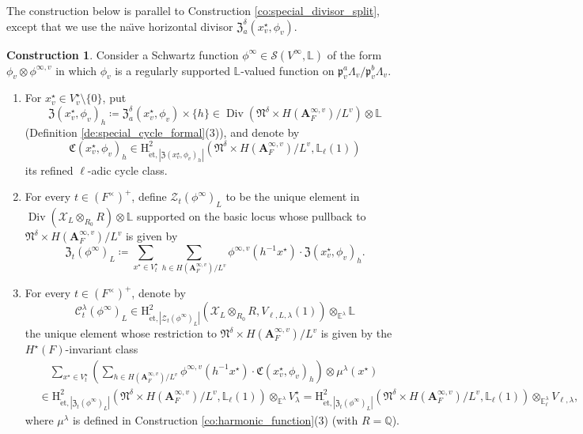 \documentclass[12pt]{amsart}
\numberwithin{equation}{section}
\theoremstyle{plain}
\theoremstyle{definition}
\newtheorem{construction}[proposition]{Construction}
\theoremstyle{remark}
\renewcommand{\b}[1]{\mathbf{#1}}
\renewcommand{\c}[1]{\mathcal{#1}}
\renewcommand{\d}[1]{\mathbb{#1}}
\newcommand{\f}[1]{\mathfrak{#1}}
\renewcommand{\r}[1]{\mathrm{#1}}
\newcommand{\s}[1]{\mathscr{#1}}
\renewcommand{\(}{\left(}
\renewcommand{\)}{\right)}
\newcommand{\bA}{\b A}
\newcommand{\cC}{\c C}
\newcommand{\cX}{\c X}
\newcommand{\cZ}{\c Z}
\newcommand{\dE}{\d E}
\newcommand{\dL}{\d L}
\newcommand{\dQ}{\d Q}
\newcommand{\fC}{\f C}
\newcommand{\fN}{\f N}
\newcommand{\fZ}{\f Z}
\newcommand{\fp}{\f p}
\newcommand{\rH}{\r H}
\newcommand{\sS}{\s S}
\newcommand{\et}{{\acute{\r{e}}\r{t}}}
\DeclareMathOperator{\Div}{Div}
\begin{document}
The construction below is parallel to Construction \ref{co:special_divisor_split}, except that we use the na\"{\i}ve horizontal divisor $\fZ_a^\delta(x^\star_v,\phi_v)$.

\begin{construction}\label{co:special_divisor_nonsplit}
Consider a Schwartz function $\phi^\infty\in\sS(V^\infty,\dL)$ of the form $\phi_v\otimes\phi^{\infty,v}$ in which $\phi_v$ is a regularly supported $\dL$-valued function on $\fp_v^a\Lambda_v/\fp_v^b\Lambda_v$.
\begin{enumerate}
  \item For $x^\star_v\in V^\star_v\setminus\{0\}$, put
      \[
      \fZ(x^\star_v,\phi_v)_h\coloneqq
      \fZ_a^\delta(x^\star_v,\phi_v)\times\{h\}\in\Div(\fN^\delta\times H(\bA_F^{\infty,v})/L^v)\otimes\dL
      \]
      (Definition \ref{de:special_cycle_formal}(3)), and denote by
      \[
      \fC(x^\star_v,\phi_v)_h\in\rH^2_{\et,|\fZ(x^\star_v,\phi_v)_h|}(\fN^\delta\times H(\bA_F^{\infty,v})/L^v,\dL_\ell(1))
      \]
      its refined $\ell$-adic cycle class.

  \item For every $t\in(F^\times)^+$, define $\cZ_t(\phi^\infty)_L$ to be the unique element in $\Div(\cX_L\otimes_{R_0}R)\otimes\dL$ supported on the basic locus whose pullback to $\fN^\delta\times H(\bA_F^{\infty,v})/L^v$ is given by
      \[
      \fZ_t(\phi^\infty)_L\coloneqq\sum_{x^\star\in V^\star_t}\sum_{h\in H(\bA_F^{\infty,v})/L^v}
      \phi^{\infty,v}(h^{-1}x^\star)\cdot\fZ(x^\star_v,\phi_v)_h.
      \]

  \item For every $t\in(F^\times)^+$, denote by
      \[
      \cC^\lambda_t(\phi^\infty)_L\in
      \rH^2_{\et,|\cZ_t(\phi^\infty)_L|}(\cX_L\otimes_{R_0}R,V_{\ell,L,\lambda}(1))\otimes_{\dE^\lambda}\dL
      \]
      the unique element whose restriction to $\fN^\delta\times H(\bA_F^{\infty,v})/L^v$ is given by the $H^\star(F)$-invariant class
      \begin{align*}
      &\quad\sum_{x^\star\in V^\star_t}\(\sum_{h\in H(\bA_F^{\infty,v})/L^v}
      \phi^{\infty,v}(h^{-1}x^\star)\cdot\fC(x^\star_v,\phi_v)_h\)\otimes\mu^\lambda(x^\star) \\
      &\in\rH^2_{\et,|\fZ_t(\phi^\infty)_L|}(\fN^\delta\times H(\bA_F^{\infty,v})/L^v,\dL_\ell(1))
      \otimes_{\dE^\lambda}V^\star_\lambda
      =\rH^2_{\et,|\fZ_t(\phi^\infty)_L|}(\fN^\delta\times H(\bA_F^{\infty,v})/L^v,\dL_\ell(1))
      \otimes_{\dE^\lambda_\ell}V_{\ell,\lambda},
      \end{align*}
      where $\mu^\lambda$ is defined in Construction \ref{co:harmonic_function}(3) (with $R=\dQ$).
\end{enumerate}
\end{construction}
\end{document}
